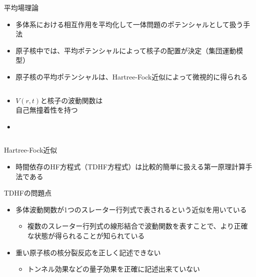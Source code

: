 \documentclass[14pt,aspectratio=169,xcolor=dvipsnames,table,dvipdfmx]{beamer}
\theoremstyle{definition}
\begin{document}
\begin{frame}{平均場理論}
  \begin{itemize}
    \item 多体系における相互作用を平均化して一体問題のポテンシャルとして扱う手法
    \item 原子核中では、平均ポテンシャルによって核子の配置が決定（集団運動模型）
    \item 原子核の平均ポテンシャルは、Hartree-Fock近似によって微視的に得られる
  \end{itemize}
  \begin{columns}[t]
    \begin{column}{.5\textwidth}
      \begin{itemize}
        \item $V(r,t)$と核子の波動関数は\\自己無撞着性を持つ
        \item
      \end{itemize}
    \end{column}
    \begin{column}{.5\textwidth}
    \end{column}
  \end{columns}
\end{frame}
\begin{frame}{Hartree-Fock近似}
  \begin{itemize}
    \item 時間依存のHF方程式（TDHF方程式）は比較的簡単に扱える第一原理計算手法である
  \end{itemize}
  \begin{block}{TDHFの問題点}
    \begin{itemize}
      \item 多体波動関数が1つのスレーター行列式で表されるという近似を用いている
            \begin{itemize}
              \item 複数のスレーター行列式の線形結合で波動関数を表すことで、より正確な状態が得られることが知られている
            \end{itemize}
      \item 重い原子核の核分裂反応を正しく記述できない
            \begin{itemize}
              \item トンネル効果などの量子効果を正確に記述出来ていない
            \end{itemize}
    \end{itemize}
  \end{block}
\end{frame}
\end{document}
